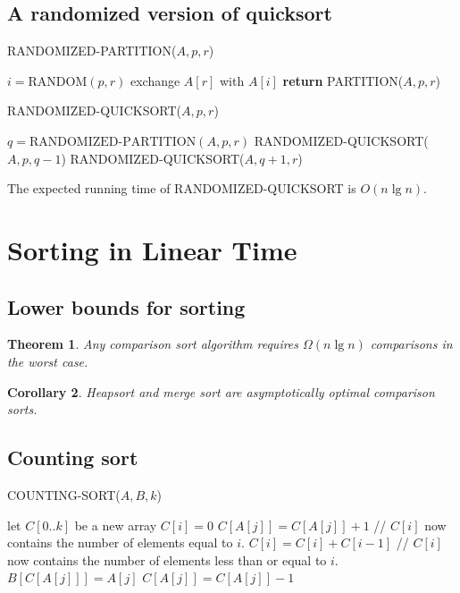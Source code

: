 \documentclass[12pt]{article}
\newtheorem{theorem}{Theorem}
\newtheorem{corollary}[theorem]{Corollary}
\begin{document}
\subsection{A randomized version of quicksort}

RANDOMIZED-PARTITION($A, p, r$)
\begin{algorithmic}[1]
\State $i = \text{RANDOM}(p,r)$
\State exchange $A[r]$ with $A[i]$
\State \textbf{return } PARTITION($A, p, r$)
\end{algorithmic}

RANDOMIZED-QUICKSORT($A, p, r$)
\begin{algorithmic}[1]
	\State $q = \text {RANDOMIZED-PARTITION}(A, p, r)$
        \State RANDOMIZED-QUICKSORT($A, p, q-1$)
        \State RANDOMIZED-QUICKSORT($A, q+1, r$)
\EndIf
\end{algorithmic}

The expected running time of RANDOMIZED-QUICKSORT is $O(n \lg n)$.

\section{Sorting in Linear Time}

\subsection{Lower bounds for sorting}

\begin{theorem}
  Any comparison sort algorithm requires $\Omega (n \lg n)$ comparisons in the worst case.
\end{theorem}

\begin{corollary}
  Heapsort and merge sort are asymptotically optimal comparison sorts.
\end{corollary}

\subsection{Counting sort}

COUNTING-SORT($A, B, k$)
\begin{algorithmic}[1]
\State let $C[0..k]$ be a new array
	\State $C[i] = 0$
\EndFor
{}
	\State $C[A[j]] = C[A[j]] + 1$
\EndFor
\State // $C[i]$ now contains the number of elements equal to $i$.
	\State $C[i] = C[i] + C[i-1]$
\EndFor
\State // $C[i]$ now contains the number of elements less than or equal to $i$.
	\State $B[C[A[j]]] = A[j]$
        \State $C[A[j]] = C[A[j]] - 1$
\EndFor
\end{algorithmic}
\end{document}
